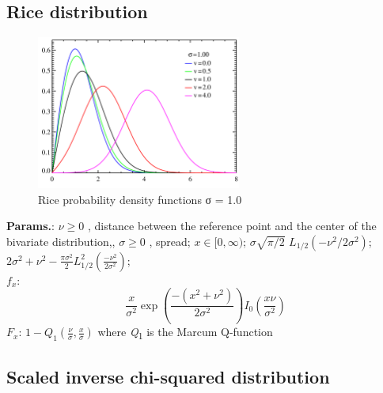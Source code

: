     
        
\subsection{Rice distribution}


    \begin{figure}[H]
        \centering
        \includegraphics[width=0.6\textwidth]{images/Rice distributiona PDF.png}
        \caption{Rice probability density functions σ = 1.0}
    \end{figure}




    {\color{darkblue} \textbf{Params.}:} {$\nu\ge 0$ , distance between the reference point and the center of the bivariate distribution,,  $\sigma\ge 0$ , spread}; {$x \in [0,\infty)$}; {$\sigma  \sqrt{\pi/2}\,\,L_{1/2}(-\nu^2/2\sigma^2)$}; {$2\sigma^2+\nu^2-\frac{\pi\sigma^2}{2}L_{1/2}^2\left(\frac{-\nu^2}{2\sigma^2}\right)$};\hspace{0.5cm}\\{\color{darkblue} \textbf{$f_x$}:} {$$\frac{x}{\sigma^2}\exp\left(\frac{-(x^2+\nu^2)}
{2\sigma^2}\right)I_0\left(\frac{x\nu}{\sigma^2}\right)$$}{\color{darkblue} \textbf{$F_x$}:} {$1-Q_1\left(\frac{\nu}{\sigma },\frac{x}{\sigma }\right)$ where \textit{Q}\textsubscript{1} is the Marcum Q-function}



    
        
\subsection{Scaled inverse chi-squared distribution}


